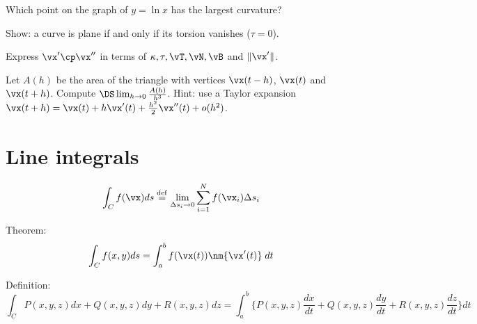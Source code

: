 \subprob Which point on the graph of $y=\ln x$ has the largest
curvature?


\problem Show: a curve is plane if and only if its torsion vanishes %
($\tau = 0$).

\problem Express $\vx'\cp\vx''$ in terms of $\kappa, \tau, \vT, \vN, %
\vB$ and $\|\vx'\|$.

\problem Let $A(h)$ be the area of the triangle with vertices %
$\vx(t-h)$, $\vx(t)$ and $\vx(t+h)$.  Compute $\DS \lim_{h\to 0}
\frac{A(h)}{h^3}$.  Hint: use a Taylor expansion $\vx(t+h) = \vx(t) +
h\vx'(t) + \frac{h^2}{2}\vx''(t) + o(h^2)$.

\noproblemfont

\section{Line integrals} %
\begin{equation}
  \int_C f(\vx) ds
  \stackrel{\rm def}{=}
  \lim _{\Delta s_i\to0}
  \sum_{i=1}^N f(\vx_i) \Delta s_i
\end{equation}

Theorem:
\begin{equation}
  \int_C f(x, y) ds = \int_a^b f(\vx(t)) \nm{\vx'(t)}\; dt
\end{equation}


Definition:
\begin{equation}
  \int_C P(x, y, z)dx + Q(x, y, z)dy + R(x, y, z)dz
  =
  \int_a^b \bigl\{P(x, y, z)\frac{dx}{dt} +
  Q(x, y, z)\frac{dy}{dt} +
  R(x, y, z)\frac{dz}{dt}\bigr\} dt
  \label{eq:integral-of-one-form}
\end{equation}


